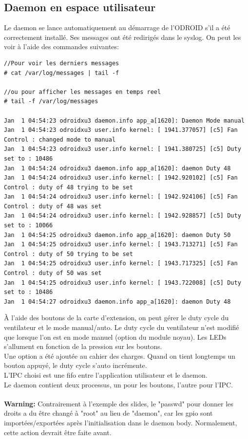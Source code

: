 \subsection{Daemon en espace utilisateur}
Le daemon se lance automatiquement au démarrage de l'ODROID s'il a été correctement installé. Ses messages ont été redirigés dans le syslog. On peut les voir à l'aide des commandes suivantes:
\begin{lstlisting}
//Pour voir les derniers messages
# cat /var/log/messages | tail -f

//ou pour afficher les messages en temps reel
# tail -f /var/log/messages

Jan  1 04:54:23 odroidxu3 daemon.info app_a[1620]: Daemon Mode manual
Jan  1 04:54:23 odroidxu3 user.info kernel: [ 1941.377057] [c5] Fan Control : changed mode to manual
Jan  1 04:54:23 odroidxu3 user.info kernel: [ 1941.380725] [c5] Duty set to : 10486
Jan  1 04:54:24 odroidxu3 daemon.info app_a[1620]: daemon Duty 48
Jan  1 04:54:24 odroidxu3 user.info kernel: [ 1942.920102] [c5] Fan Control : duty of 48 trying to be set
Jan  1 04:54:24 odroidxu3 user.info kernel: [ 1942.924106] [c5] Fan Control : duty of 48 was set
Jan  1 04:54:24 odroidxu3 user.info kernel: [ 1942.928857] [c5] Duty set to : 10066
Jan  1 04:54:25 odroidxu3 daemon.info app_a[1620]: daemon Duty 50
Jan  1 04:54:25 odroidxu3 user.info kernel: [ 1943.713271] [c5] Fan Control : duty of 50 trying to be set
Jan  1 04:54:25 odroidxu3 user.info kernel: [ 1943.717325] [c5] Fan Control : duty of 50 was set
Jan  1 04:54:25 odroidxu3 user.info kernel: [ 1943.722008] [c5] Duty set to : 10486
Jan  1 04:54:27 odroidxu3 daemon.info app_a[1620]: daemon Duty 48
\end{lstlisting}

À l'aide des boutons de la carte d'extension, on peut gérer le duty cycle du ventilateur et le mode manual/auto. Le duty cycle du ventilateur n'est modifié que lorsque l'on est en mode manuel (option du module noyau). Les LEDs s'allument en fonction de la pression sur les boutons.\\
Une option a été ajoutée au cahier des charges. Quand on tient longtemps un bouton appuyé, le duty cycle s'auto incrémente.\\
L'IPC choisi est une fifo entre l'application utilisateur et le daemon.\\
Le daemon contient deux processus, un pour les boutons, l'autre pour l'IPC.\\\\
\textbf{Warning: } Contrairement à l'exemple des slides, le "passwd" pour donner les droits a du être changé à "root" au lieu de "daemon", car les gpio sont importées/exportées après l'initialisation dans le daemon body. Normalement, cette action devrait être faite avant.


